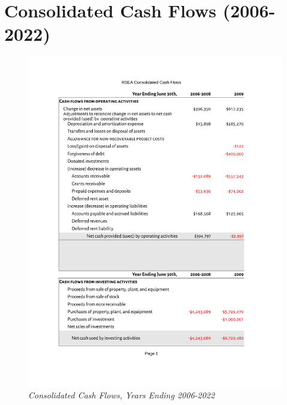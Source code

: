 
\chapter{Consolidated Cash Flows (2006-2022)}

\begin{figure}[hbt]
  \caption[Consolidated Cash Flows, Years Ending 2006–2022]{\textit{Consolidated Cash Flows, Years Ending 2006-2022}}\label{fig:consolidated_cash_flows} %
  \includegraphics[page=1,scale=0.8]{Consolidated_Cash_Flows_2006-2022} %
\end{figure}
